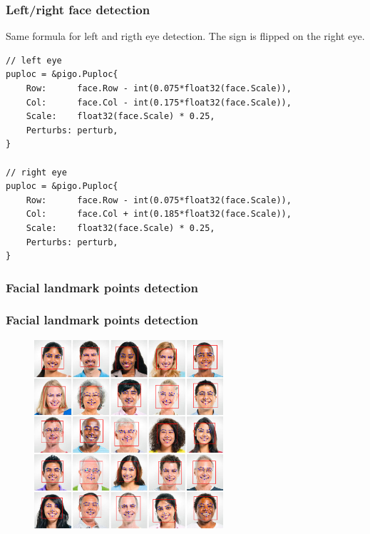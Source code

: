 \documentclass[9pt]{beamer}
\begin{document}
\begin{frame}[fragile]
\frametitle{Left/right face detection}


Same formula for left and rigth eye detection. The sign is flipped on the right eye.



\begin{verbatim}
// left eye
puploc = &pigo.Puploc{
    Row:      face.Row - int(0.075*float32(face.Scale)),
    Col:      face.Col - int(0.175*float32(face.Scale)),
    Scale:    float32(face.Scale) * 0.25,
    Perturbs: perturb,
}

// right eye
puploc = &pigo.Puploc{
    Row:      face.Row - int(0.075*float32(face.Scale)),
    Col:      face.Col + int(0.185*float32(face.Scale)),
    Scale:    float32(face.Scale) * 0.25,
    Perturbs: perturb,
}

\end{verbatim}



\end{frame}

\begin{frame}[fragile]
\frametitle{Facial landmark points detection}


\end{frame}

\begin{frame}[fragile]
\frametitle{Facial landmark points detection}


\begin{figure}[h]
\begin{center}
\includegraphics[width=7cm,height=7cm]{assets/pigo_landmark.png}
\end{center}

\end{figure}


\end{frame}
\end{document}
